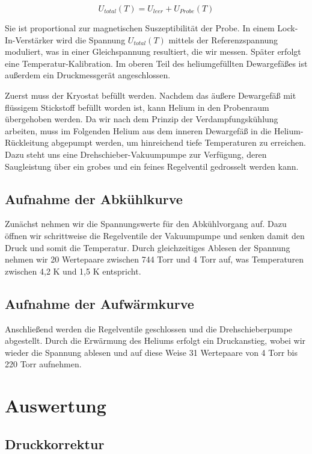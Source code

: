 \documentclass[bigchapter,colorback,accentcolor=tud4b,linedtoc,11pt]{tudreport}
\begin{document}
$$U_{total}(T) = U_{leer} + U_{Probe}(T)$$

Sie ist proportional zur magnetischen Suszeptibilität der Probe. In einem Lock-In-Verstärker wird die Spannung $U_{total}(T)$ mittels der Referenzspannung moduliert, was in einer Gleichspannung resultiert, die wir messen. Später erfolgt eine Temperatur-Kalibration. Im oberen Teil des heliumgefüllten Dewargefäßes ist außerdem ein Druckmessgerät angeschlossen.

Zuerst muss der Kryostat befüllt werden. Nachdem das äußere Dewargefäß mit flüssigem Stickstoff befüllt worden ist, kann Helium in den Probenraum übergehoben werden. Da wir nach dem Prinzip der Verdampfungskühlung arbeiten, muss im Folgenden Helium aus dem inneren Dewargefäß in die Helium-Rückleitung abgepumpt werden, um hinreichend tiefe Temperaturen zu erreichen. Dazu steht uns eine Drehschieber-Vakuumpumpe zur Verfügung, deren Saugleistung über ein grobes und ein feines Regelventil gedrosselt werden kann. 

\section{Aufnahme der Abkühlkurve}

Zunächst nehmen wir die Spannungswerte für den Abkühlvorgang auf. Dazu öffnen wir schrittweise die Regelventile der Vakuumpumpe und senken damit den Druck und somit die Temperatur. Durch gleichzeitiges Ablesen der Spannung nehmen wir 20 Wertepaare zwischen 744 Torr und 4 Torr auf, was Temperaturen zwischen 4,2 K und 1,5 K entspricht.

\section{Aufnahme der Aufwärmkurve}

Anschließend werden die Regelventile geschlossen und die Drehschieberpumpe abgestellt. Durch die Erwärmung des Heliums erfolgt ein Druckanstieg, wobei wir wieder die Spannung ablesen und auf diese Weise 31 Wertepaare von 4 Torr bis 220 Torr aufnehmen.

\chapter{Auswertung}

\section{Druckkorrektur}
\end{document}
